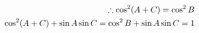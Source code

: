 \documentclass[preview]{standalone}
\begin{document}
\begin{align*}
\special{dvisvgm:raw <g id='unique000'>}\therefore \cos^2(A+C) = \cos^2 B\\ \special{dvisvgm:raw </g>}\special{dvisvgm:raw <g id='unique001'>}\cos^2(A+C)+\sin A\sin C=\cos^2 B+\sin A\sin C=1\special{dvisvgm:raw </g>}
\end{align*}
\end{document}
